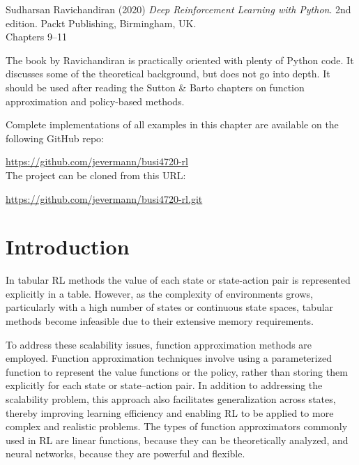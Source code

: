 \begin{resourcebox}
Sudharsan Ravichandiran (2020) \emph{Deep Reinforcement Learning with Python}. 2nd edition. Packt Publishing, Birmingham, UK. \\
\vspace{0.5\baselineskip}
Chapters 9--11
\end{resourcebox}

The book by Ravichandiran is practically oriented with plenty of Python code. It discusses some of the theoretical background, but does not go into depth. It should be used after reading the Sutton \& Barto chapters on function approximation and policy-based methods.


\begin{resourcebox}
Complete implementations of all examples in this chapter are available on the following GitHub repo:

\small\url{https://github.com/jevermann/busi4720-rl}\normalsize \\

The project can be cloned from this URL:

\small\url{https://github.com/jevermann/busi4720-rl.git}\normalsize
\end{resourcebox}


\section{Introduction}

In tabular RL methods the value of each state or state-action pair is represented explicitly in a table. However, as the complexity of environments grows, particularly with a high number of states or continuous state spaces, tabular methods become infeasible due to their extensive memory requirements. 

To address these scalability issues, function approximation methods are employed. Function approximation techniques involve using a parameterized function to represent the value functions or the policy, rather than storing them explicitly for each state or state--action pair. In addition to addressing the scalability problem, this approach also facilitates generalization across states, thereby improving learning efficiency and enabling RL to be applied to more complex and realistic problems. The types of function approximators commonly used in RL are linear functions, because they can be theoretically analyzed, and neural networks, because they are powerful and flexible. 

